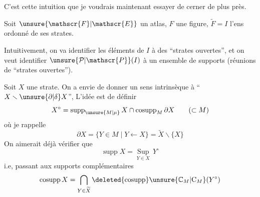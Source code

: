 C'est cette intuition que je voudrais maintenant essayer de cerner de plus près.


Soit $\unsure{\mathscr{F}|\mathscr{E}}$ un atlas, $F$ une figure, $\widetilde F=I$ l'ens ordonné de ses strates.


Intuitivement, on va identifier les éléments de $I$ à des ``strates ouvertes'', et on veut identifier $\unsure{\mathcal{P}|\mathscr{P}}(I)$ à  un ensemble de supports (réunions de ``strates ouvertes'').

Soit $X$ une strate. On a envie de donner un sens intrinsèque à ``$X\smallsetminus\unsure{\partial|\delta}X$'', L'idée est de  définir
\[
X^{\circ}=\operatorname{supp}_{\unsure{M|\mu}}X\cap\operatorname{cosupp}_M\partial X\qquad(\subset M)
\]
où je rappelle
\[
\partial X=\{Y\in M\mid Y\leftarrow X\}=\widetilde X\smallsetminus\{X\}
\]
On aimerait déjà vérifier que
\[
\operatorname{supp}X=\underset{Y\in X}{\operatorname{Sup}}\,Y^{\circ}
\]
i.e, passant aux supports complémentaires
\[
\operatorname{cosupp}X=\bigcap_{Y\in\widetilde X}\deleted{\operatorname{cosupp}}\unsure{\mathbb{C}_M|\mathrm{C}_M}(Y^{\circ})
\]

